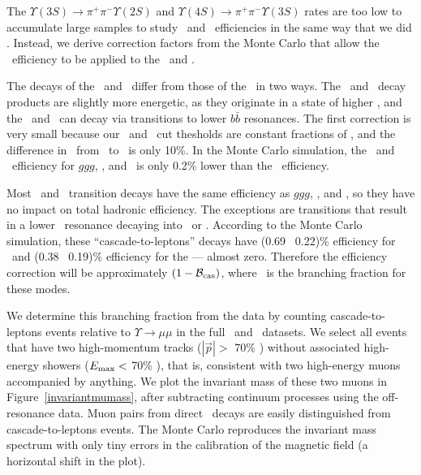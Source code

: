 \documentclass{cornell}
\begin{document}
The $\Upsilon(3S) \to \pi^+\pi^- \Upsilon(2S)$ and $\Upsilon(4S) \to
\pi^+\pi^- \Upsilon(3S)$ rates are too low to accumulate large samples
to study \uss\ and \usss\ efficiencies in the same way that we did
\us.  Instead, we derive correction factors from the Monte Carlo that
allow the \us\ efficiency to be applied to the \uss\ and \usss.

The decays of the \uss\ and \usss\ differ from those of the \us\ in
two ways.  The \uss\ and \usss\ decay products are slightly more
energetic, as they originate in a state of higher \ecm, and the \uss\
and \usss\ can decay via transitions to lower $b\bar{b}$ resonances.
The first correction is very small because our \pmax\ and \visen\ cut
thesholds are constant fractions of \ecm, and the difference in \ecm\
from \us\ to \usss\ is only 10\%.  In the Monte Carlo simulation, the
\uss\ and \usss\ efficiency for $ggg$, \gggamma, and \qqbar\ is only
0.2\% lower than the \us\ efficiency.

Most \uss\ and \usss\ transition decays have the same efficiency as
$ggg$, \gggamma, and \qqbar, so they have no impact on total hadronic
efficiency.  The exceptions are transitions that result in a lower
\ups\ resonance decaying into \ee\ or \mumu.  According to the Monte
Carlo simulation, these ``cascade-to-leptons'' decays have (0.69 \PM\
0.22)\% efficiency for \uss\ and (0.38 \PM\ 0.19)\% efficiency for the
\usss--- almost zero.  Therefore the efficiency correction will be
approximately $(1 - {\mathcal B}_{\mbox{\scriptsize cas}})$, where \bcas\ is the
branching fraction for these modes.

We determine this branching fraction from the data by counting
cascade-to-leptons events relative to $\Upsilon \to \mu\mu$ in the
full \uss\ and \usss\ datasets.  We select all events that have two
high-momentum tracks ($|\vec{p}| >$ 70\% \ebeam) without associated
high-energy showers ($E_{\mbox{\scriptsize max}} <$ 70\% \ebeam), that is,
consistent with two high-energy muons accompanied by anything.  We
plot the invariant mass of these two muons in Figure~\ref{invariantmumass}, after subtracting continuum processes using the
off-resonance data.  Muon pairs from direct \ups\ decays are easily
distinguished from cascade-to-leptons events.  The Monte Carlo
reproduces the invariant mass spectrum with only tiny errors in the
calibration of the magnetic field (a horizontal shift in the plot).
\end{document}
